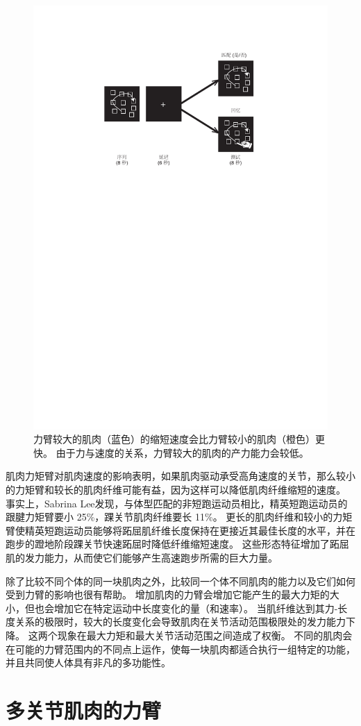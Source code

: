 \begin{figure}[!htb]
	\centering
	\includegraphics[width=0.6\linewidth]{chap6/6_8}
	\caption{力臂较大的肌肉（蓝色）的缩短速度会比力臂较小的肌肉（橙色）更快。
		由于力与速度的关系，力臂较大的肌肉的产力能力会较低。 \label{fig:6_8}}
\end{figure}


肌肉力矩臂对肌肉速度的影响表明，如果肌肉驱动承受高角速度的关节，那么较小的力矩臂和较长的肌肉纤维可能有益，因为这样可以降低肌肉纤维缩短的速度。
事实上，Sabrina Lee\cite{lee2009built}发现，与体型匹配的非短跑运动员相比，精英短跑运动员的跟腱力矩臂要小 25\%，踝关节肌肉纤维要长 11\%。
更长的肌肉纤维和较小的力矩臂使精英短跑运动员能够将跖屈肌纤维长度保持在更接近其最佳长度的水平，并在跑步的蹬地阶段踝关节快速跖屈时降低纤维缩短速度。
这些形态特征增加了跖屈肌的发力能力，从而使它们能够产生高速跑步所需的巨大力量。


除了比较不同个体的同一块肌肉之外，比较同一个体不同肌肉的能力以及它们如何受到力臂的影响也很有帮助。
增加肌肉的力臂会增加它能产生的最大力矩的大小，但也会增加它在特定运动中长度变化的量（和速率）。
当肌纤维达到其力-长度关系的极限时，较大的长度变化会导致肌肉在关节活动范围极限处的发力能力下降。
这两个现象在最大力矩和最大关节活动范围之间造成了权衡。
不同的肌肉会在可能的力臂范围内的不同点上运作，使每一块肌肉都适合执行一组特定的功能，并且共同使人体具有非凡的多功能性。


\section{多关节肌肉的力臂}


